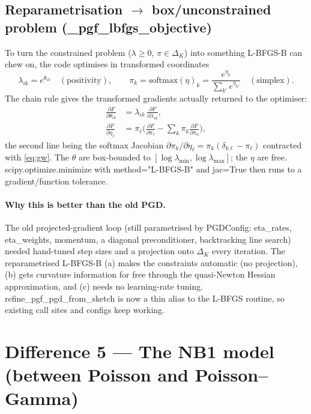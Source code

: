 \documentclass[11pt]{article}
\newcommand{\lam}{\bm{\lambda}}
\newcommand{\code}[1]{\texttt{\small #1}}
\def\code#1{#1}%
\def\small{}%
\def\bm#1{#1}%
\theoremstyle{definition}
\begin{document}
\subsection{Reparametrisation $\to$ box/unconstrained problem (\code{\_pgf\_lbfgs\_objective})}
To turn the constrained problem ($\lam\ge0$, $\bm\pi\in\Delta_K$) into something L-BFGS-B can
chew on, the code optimises in transformed coordinates
\begin{equation}
\lambda_{ik}=e^{\theta_{ik}}\quad(\text{positivity}),
\qquad
\pi_k=\mathrm{softmax}(\bm\eta)_k=\frac{e^{\eta_k}}{\sum_{k'} e^{\eta_{k'}}}\quad(\text{simplex}).
\end{equation}
The chain rule gives the transformed gradients actually returned to the optimiser:
\begin{align}
\frac{\partial F}{\partial\theta_{ik}} &= \lambda_{ik}\,\frac{\partial F}{\partial\lambda_{ik}},\\
\frac{\partial F}{\partial\eta_\ell} &= \pi_\ell\Big(\frac{\partial F}{\partial\pi_\ell}-\sum_{k}\pi_k\frac{\partial F}{\partial\pi_k}\Big),
\label{eq:softmaxjac}
\end{align}
the second line being the softmax Jacobian $\partial\pi_k/\partial\eta_\ell=\pi_k(\delta_{k\ell}-\pi_\ell)$
contracted with \eqref{eq:gw}. The $\theta$ are box-bounded to
$[\log\lambda_{\min},\log\lambda_{\max}]$; the $\eta$ are free. \code{scipy.optimize.minimize}
with \code{method="L-BFGS-B"} and \code{jac=True} then runs to a gradient/function tolerance.

\paragraph{Why this is better than the old PGD.} The old projected-gradient loop
(still parametrised by \code{PGDConfig}: \code{eta\_rates}, \code{eta\_weights},
\code{momentum}, a diagonal preconditioner, backtracking line search) needed hand-tuned step
sizes and a projection onto $\Delta_K$ every iteration. The reparametrised L-BFGS-B
(a) makes the constraints automatic (no projection), (b) gets curvature information for free
through the quasi-Newton Hessian approximation, and (c) needs no learning-rate tuning.
\code{refine\_pgf\_pgd\_from\_sketch} is now a thin alias to the L-BFGS routine, so existing
call sites and configs keep working.

\section{Difference 5 --- The NB1 model (between Poisson and Poisson--Gamma)}\label{sec:nb1}
\end{document}

